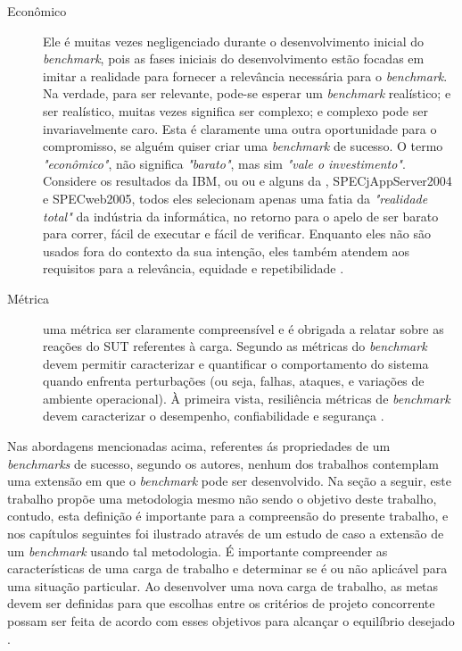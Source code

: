 \begin{description}
	\item[Econômico] Ele é muitas vezes negligenciado durante o desenvolvimento inicial do \textit{benchmark}, pois as fases iniciais do desenvolvimento estão focadas em imitar a realidade para fornecer a relevância necessária para o \textit{benchmark}. Na verdade, para ser relevante, pode-se esperar um \textit{benchmark} realístico; e ser realístico, muitas vezes significa ser complexo; e complexo pode ser invariavelmente caro. Esta é claramente uma outra oportunidade para o compromisso, se alguém quiser criar uma \textit{benchmark} de sucesso. O termo \textit{"econômico"}, não significa \textit{"barato"}, mas sim \textit{"vale o investimento"}.
	Considere os resultados da IBM,  ou   ou   e alguns da , SPECjAppServer2004 e  SPECweb2005, todos eles selecionam apenas uma fatia da \textit{"realidade total"} da indústria da informática, no retorno para o apelo de ser barato para correr, fácil de executar e fácil de verificar. Enquanto eles não são usados fora do contexto da sua intenção, eles também atendem aos requisitos para a relevância, equidade e repetibilidade \cite{Huppler2009}. 
	
	\item[Métrica] uma métrica ser claramente compreensível e é obrigada a relatar sobre as reações do SUT referentes à carga. Segundo  as métricas do \textit{benchmark} devem permitir caracterizar e quantificar o comportamento do sistema quando enfrenta perturbações (ou seja, falhas, ataques, e variações de ambiente operacional). À primeira vista, resiliência métricas de \textit{benchmark} devem caracterizar o desempenho, confiabilidade e segurança \cite{Marco2012}.
	
\end{description}

Nas abordagens mencionadas acima, referentes ás propriedades de um \textit{benchmarks} de sucesso, segundo os autores, nenhum dos trabalhos contemplam uma extensão em que o \textit{benchmark} pode ser desenvolvido. Na seção a seguir, este trabalho propõe uma metodologia mesmo não sendo o objetivo deste trabalho, contudo, esta definição é importante para a compreensão do presente trabalho, e nos capítulos seguintes foi ilustrado através de um estudo de caso a extensão de um \textit{benchmark} usando tal metodologia. É importante compreender as características de uma carga de trabalho e determinar se é ou não aplicável para uma situação particular. Ao desenvolver uma nova carga de trabalho, as metas devem ser definidas para que escolhas entre os critérios de projeto concorrente possam ser feita de acordo com esses objetivos para alcançar o equilíbrio desejado \cite{Kistowski2015}.

